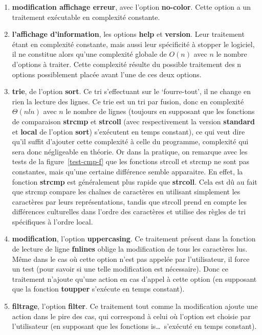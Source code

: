 \documentclass[12pt]{article}
\begin{document}
    \begin{enumerate}
        \item[] \textbf{modification affichage erreur},  avec l'option 
        \textbf{no-color}. Cette option a un traitement exécutable en 
        complexité constante.
        \item[] \textbf{l'affichage d'information}, les options \textbf{help} et 
        \textbf{version}. Leur traitement étant en complexité constante, mais 
        aussi leur spécificité à stopper le logiciel, il ne constitue alors 
        qu'une complexité globale de $O(n)$ avec $n$ le nombre d'options à 
        traiter. Cette complexité résulte du possible traitement des n options 
        possiblement placée avant l'une de ces deux options.
        \item[] \textbf{trie}, de l'option \textbf{sort}. Ce tri s'effectuant 
        sur le `fourre-tout', il ne change en rien la lecture des lignes. Ce trie 
        est un tri par fusion, donc en complexité $\Theta(nln)$ avec $n$ le 
        nombre de lignes (toujours en supposant que les fonctions de comparaison 
        \textbf{strcmp} et \textbf{strcoll} (avec respectivement la version 
        \textbf{standard} et \textbf{local} de l'option \textbf{sort}) 
        s'exécutent en temps constant), ce qui veut dire qu'il suffit d'ajouter 
        cette complexité à celle du programme, complexité qui sera donc 
        négligeable en théorie. Or dans la pratique, on remarque avec les tests 
        de la figure~\ref{test-cmp-f} que les fonctions strcoll et strcmp ne 
        sont pas constantes, mais qu'une certaine différence semble apparaitre.
        En effet, la fonction \textbf{strcmp} est généralement plus rapide que 
        \textbf{strcoll}. Cela est dû au fait que strcmp compare les chaînes de 
        caractères en utilisant simplement les caractères par leurs
        représentations, tandis que strcoll prend en compte les différences 
        culturelles dans l'ordre des caractères et utilise des règles de tri 
        spécifiques à l'ordre local.        
        \item[] \textbf{modification}, l'option \textbf{uppercasing}. Ce 
        traitement présent dans la fonction de lecture de ligne \textbf{fnlines} 
        oblige la modification de tous les caractères lus. Même dans le cas où 
        cette option n'est pas appelée par l'utilisateur, il force un test 
        (pour savoir si une telle modification est nécessaire). Donc ce 
        traitement n'ajoute qu'une action en cas d'appel à cette option (en 
        supposant que la fonction \textbf{toupper} s'exécute en temps constant).
        \item[] \textbf{filtrage}, l'option \textbf{filter}. Ce traitement tout 
        comme la modification ajoute une action dans le pire des cas, qui 
        correspond à celui où l'option est choisie par l'utilisateur (en 
        supposant que les fonctions is\ldots~s'exécuté en temps constant). 
    \end{enumerate}
\end{document}
